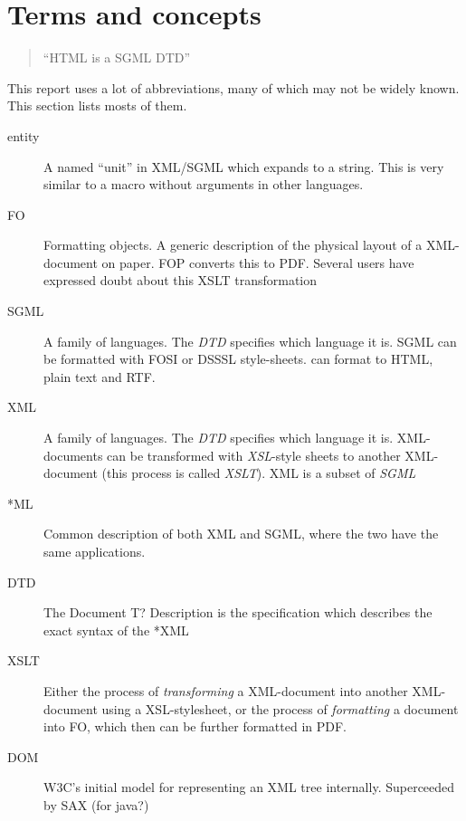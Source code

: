 
\section{Terms and concepts}
\label{sec:terms-and-concepts}

\begin{quotation}
  ``HTML is a SGML DTD''
\end{quotation}

This report uses a lot of abbreviations, many of which may not be
widely known.  This section lists mosts of them.

\begin{description}

\item[entity] A named ``unit'' in XML/SGML which expands to a string.
  This is very similar to a macro without arguments in other
  languages.
  
\item[FO] Formatting objects.  A generic description of the physical
  layout of a XML-document on paper.  FOP converts this to PDF.
  \textsf{Several users have expressed doubt about this XSLT
    transformation}
  
\item[SGML] A family of languages.  The \textit{DTD} specifies which
  language it is.  SGML can be formatted with FOSI or DSSSL
  style-sheets.   can format to HTML, plain text and
  RTF. 
  
\item[XML] A family of languages.  The \textit{DTD} specifies which
  language it is.  XML-documents can be transformed with
  \textit{XSL}-style sheets to another XML-document (this process is
  called \textit{XSLT}).  XML is a subset of \textit{SGML}


\item[*ML] Common description of both XML and SGML, where the two have
  the same applications.

\item[DTD] The \textsf{Document T? Description} is the specification
  which describes the exact syntax of the *XML


\item[XSLT] Either the process of \textit{transforming} a XML-document into
  another XML-document using a XSL-stylesheet, or the process of
  \textit{formatting} a document into FO, which then can be further
  formatted in PDF.

\item[DOM] \textsf{W3C's initial model for representing an XML tree
    internally.  Superceeded by SAX (\textsf{for java?)}}
  

\end{description}
